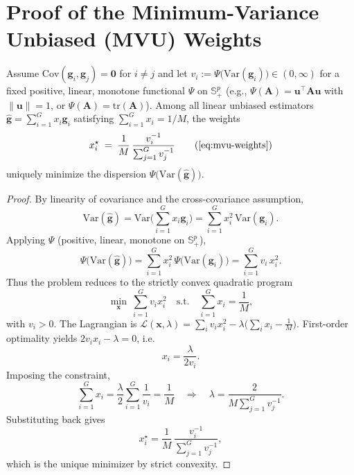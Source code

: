 \appendix

\section{Proof of the Minimum-Variance Unbiased (MVU) Weights}
\label{app:mvu-weights}

\begin{lemma}\label{lem:mvu-weights}
Assume $\mathrm{Cov}(\boldsymbol{g}_i,\boldsymbol{g}_j)=\boldsymbol{0}$ for $i\neq j$ and let $v_i:=\Psi\!\big(\mathrm{Var}(\boldsymbol{g}_i)\big)\in(0,\infty)$ for a fixed positive, linear, monotone functional $\Psi$ on $\mathbb{S}^p_+$ (e.g., $\Psi(\boldsymbol{A})=\boldsymbol{u}^\top\boldsymbol{A}\boldsymbol{u}$ with $\|\boldsymbol{u}\|{=}1$, or $\Psi(\boldsymbol{A})=\mathrm{tr}(\boldsymbol{A})$). Among all linear unbiased estimators $\widehat{\boldsymbol{g}}=\sum_{i=1}^G x_i\boldsymbol{g}_i$ satisfying $\sum_{i=1}^G x_i=1/M$, the weights
\begin{equation}
  x_i^\star \;=\; \frac{1}{M}\,\frac{v_i^{-1}}{\sum_{j=1}^{G} v_j^{-1}}
  \tag{\ref{eq:mvu-weights}}
\end{equation}
uniquely minimize the dispersion $\Psi\!\big(\mathrm{Var}(\widehat{\boldsymbol{g}})\big)$.
\end{lemma}

\begin{proof}
By linearity of covariance and the cross-covariance assumption,
\[
\mathrm{Var}(\widehat{\boldsymbol{g}})=\mathrm{Var}\Big(\sum_{i=1}^G x_i\boldsymbol{g}_i\Big)
=\sum_{i=1}^G x_i^2\,\mathrm{Var}(\boldsymbol{g}_i).
\]
Applying $\Psi$ (positive, linear, monotone on $\mathbb{S}^p_+$),
\[
\Psi\!\big(\mathrm{Var}(\widehat{\boldsymbol{g}})\big)
=\sum_{i=1}^G x_i^2\,\Psi\!\big(\mathrm{Var}(\boldsymbol{g}_i)\big)
=\sum_{i=1}^G v_i\,x_i^2.
\]
Thus the problem reduces to the strictly convex quadratic program
\[
\min_{\boldsymbol{x}}\ \sum_{i=1}^G v_i x_i^2
\quad\text{s.t.}\quad \sum_{i=1}^G x_i=\frac{1}{M},
\]
with $v_i>0$. The Lagrangian is
\(
\mathcal{L}(\boldsymbol{x},\lambda)=\sum_i v_i x_i^2 - \lambda\Big(\sum_i x_i-\frac{1}{M}\Big).
\)
First-order optimality yields \(2v_i x_i - \lambda = 0\), i.e.
\[
x_i=\frac{\lambda}{2v_i}.
\]
Imposing the constraint,
\[
\sum_{i=1}^G x_i=\frac{\lambda}{2}\sum_{i=1}^G \frac{1}{v_i}=\frac{1}{M}
\quad\Longrightarrow\quad
\lambda=\frac{2}{M\sum_{j=1}^G v_j^{-1}}.
\]
Substituting back gives
\[
x_i^\star=\frac{1}{M}\,\frac{v_i^{-1}}{\sum_{j=1}^G v_j^{-1}},
\]
which is the unique minimizer by strict convexity.
\end{proof}

